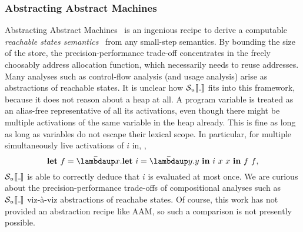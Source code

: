 \subsubsection*{Abstracting Abstract Machines}
Abstracting Abstract Machines~\citep{aam} is an ingenious recipe to derive
a computable \emph{reachable states semantics}~\citep{Cousot:21} from any
small-step semantics.
By bounding the size of the store, the precision-performance trade-off
concentrates in the freely choosably address allocation function, which
necessarily needs to reuse addresses.
Many analyses such as control-flow analysis (and usage analysis) arise as
abstractions of reachable states.
It is unclear how $\semusg{\wild}$ fits into this framework, because it does not
reason about a heap at all.
A program variable is treated as an alias-free representative of all
its activations, even though there might be multiple activations of the same
variable in the heap already.
This is fine as long as long as variables do not escape their lexical scope.
In particular, for multiple simultaneously live activations of $i$ in, \eg,
\[
  \Let{f}{\Lam{x}{\Let{i}{\Lam{y}{y}}{i~x~x}}}{f~f},
\]
$\semusg{\wild}$ is able to correctly deduce that $i$ is evaluated at most once.
We are curious about the precision-performance trade-offs of compositional
analyses such as $\semusg{\wild}$ viz-à-viz abstractions of reachabe states.
Of course, this work has not provided an abstraction recipe like AAM, so such a
comparison is not presently possible.

